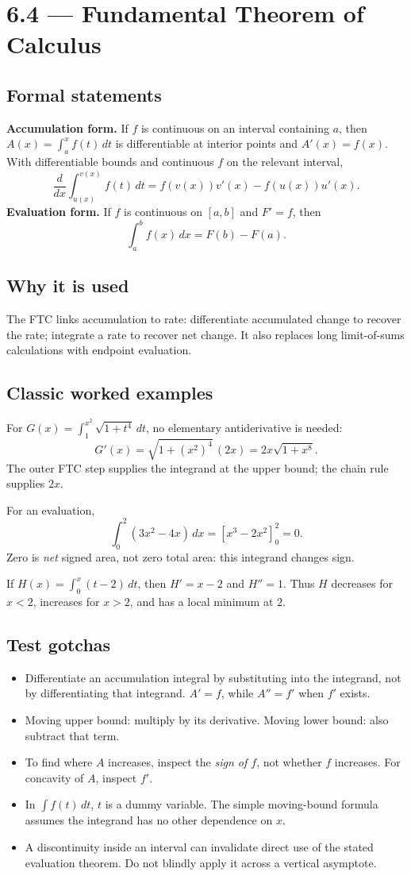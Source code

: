 \documentclass[11pt]{article}
\newcommand{\topic}[2]{\clearpage\section*{#1 --- #2}}
\newcommand{\dx}{\,dx}
\begin{document}
\topic{6.4}{Fundamental Theorem of Calculus}
\subsection*{Formal statements}
\textbf{Accumulation form.} If $f$ is continuous on an interval containing $a$, then
$A(x)=\int_a^x f(t)\,dt$ is differentiable at interior points and $A'(x)=f(x)$.
With differentiable bounds and continuous $f$ on the relevant interval,
\[
\frac{d}{dx}\int_{u(x)}^{v(x)}f(t)\,dt
=f(v(x))v'(x)-f(u(x))u'(x).
\]
\textbf{Evaluation form.} If $f$ is continuous on $[a,b]$ and $F'=f$, then
\[
\int_a^b f(x)\dx=F(b)-F(a).
\]
\subsection*{Why it is used}
The FTC links accumulation to rate: differentiate accumulated change to recover the rate; integrate a rate to recover net change. It also replaces long limit-of-sums calculations with endpoint evaluation.

\subsection*{Classic worked examples}
For $G(x)=\int_1^{x^2}\sqrt{1+t^4}\,dt$, no elementary antiderivative is needed:
\[
G'(x)=\sqrt{1+(x^2)^4}\,(2x)=2x\sqrt{1+x^8}.
\]
The outer FTC step supplies the integrand at the upper bound; the chain rule supplies $2x$.

For an evaluation,
\[
\int_0^2(3x^2-4x)\dx=[x^3-2x^2]_0^2=0.
\]
Zero is \emph{net} signed area, not zero total area: this integrand changes sign.

If $H(x)=\int_0^x(t-2)\,dt$, then $H'=x-2$ and $H''=1$.
Thus $H$ decreases for $x<2$, increases for $x>2$, and has a local minimum at $2$.

\subsection*{Test gotchas}
\begin{itemize}
\item Differentiate an accumulation integral by substituting into the integrand, not by differentiating that integrand. $A'=f$, while $A''=f'$ when $f'$ exists.
\item Moving upper bound: multiply by its derivative. Moving lower bound: also subtract that term.
\item To find where $A$ increases, inspect the \emph{sign of $f$}, not whether $f$ increases. For concavity of $A$, inspect $f'$.
\item In $\int f(t)\,dt$, $t$ is a dummy variable. The simple moving-bound formula assumes the integrand has no other dependence on $x$.
\item A discontinuity inside an interval can invalidate direct use of the stated evaluation theorem. Do not blindly apply it across a vertical asymptote.
\end{itemize}
\end{document}
